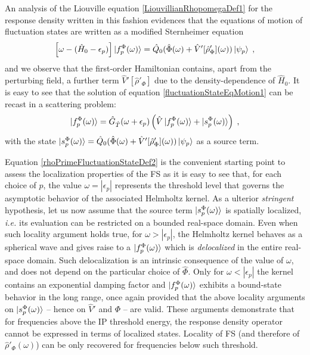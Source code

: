 \documentclass[reprint,aps,prb]{revtex4-1}
\newcommand{\eps}{\epsilon}
\newcommand{\be}{\begin{equation}}
\newcommand{\ee}{\end{equation}}
\newcommand{\lb}{\label}
\newcommand{\op}[1]{\hat {#1}}
\newcommand{\dm}{\op{\rho}}
\newcommand{\hnot}{\op{H}_0}
\newcommand{\GH}{\op G_{\op T}}
\begin{document}
An analysis of the Liouville equation \eqref{LiouvillianRhopomegaDef1} for the response density written in this fashion evidences that the equations of motion of fluctuation states  are
written as a modified Sternheimer equation~\cite{mahan1980,giustino2012,giustino2014}
\be\lb{fluctuationStateEqMotion1}
\left[\omega - (\hnot-\eps_p)\right]\ket{f_p^\Phi(\omega)} = \op Q_0(\op\Phi(\omega)+\op V'[\dm'_\Phi](\omega))\ket{\psi_p} \;,
\ee
and we observe that the first-order Hamiltonian contains,
apart from the perturbing field, a further term $\op V'[\dm'_\Phi]$ due to the density-dependence of $\hnot$.
It is easy to see that the solution of equation \eqref{fluctuationStateEqMotion1} can be recast in a scattering problem:
\be\lb{rhoPrimeFluctuationStateDef2}
\ket{f_p^\Phi(\omega)} = \GH(\omega+\epsilon_p)\left(\op V\ket{f_p^\Phi(\omega)} + \ket{s_p^\Phi(\omega)} \right)\;,
\ee
with the state
$
\ket{s_p^\Phi(\omega)} = \op Q_0(\op \Phi(\omega) +\op V'[\dm'_\Phi](\omega) )\ket{\psi_p}
$ as a source term.

Equation \eqref{rhoPrimeFluctuationStateDef2} is the convenient starting point to assess the localization properties of the FS as it is easy to see that, for each choice of $p$, the value $\omega = |\eps_p|$ represents the threshold level that governs the asymptotic behavior of the associated Helmholtz kernel.
As a ulterior \emph{stringent} hypothesis, let us now assume that the source term $\ket{s_p^\Phi(\omega)}$ is spatially localized, \textit{i.e.} its evaluation can be restricted on a bounded real-space domain.
Even when such locality argument holds true, for $\omega > |\eps_p|$,
the Helmholtz kernel behaves as a spherical wave and  gives raise to a $\ket{f^\Phi_p(\omega)}$ which is \emph{delocalized} in the entire real-space domain.
Such delocalization is an intrinsic consequence of the value of $\omega$, and does not depend on the particular choice of
$\op \Phi$.
Only for $\omega < |\eps_p|$ the kernel contains an exponential damping factor and $\ket{f^\Phi_p(\omega)}$ exhibits a bound-state behavior in the long range,
once again provided that the above locality arguments on $\ket{s_p^\Phi(\omega)}$ -- hence on $\op V'$ and $\Phi$ -- are valid.
These arguments demonstrate that for frequencies above the IP threshold energy, the response density operator cannot be expressed in terms of localized states. Locality of FS (and therefore of $\dm'_\Phi(\omega)$) can be only recovered for frequencies below such threshold.
\end{document}
